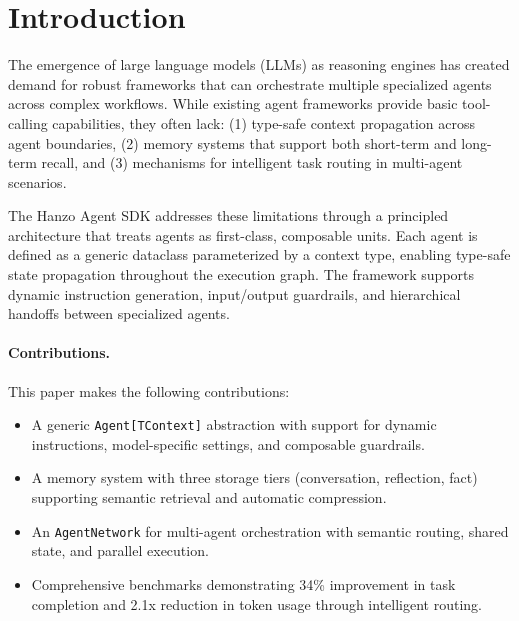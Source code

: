 \section{Introduction}


The emergence of large language models (LLMs) as reasoning engines has created demand for robust frameworks that can orchestrate multiple specialized agents across complex workflows. While existing agent frameworks provide basic tool-calling capabilities, they often lack: (1) type-safe context propagation across agent boundaries, (2) memory systems that support both short-term and long-term recall, and (3) mechanisms for intelligent task routing in multi-agent scenarios.

The Hanzo Agent SDK addresses these limitations through a principled architecture that treats agents as first-class, composable units. Each agent is defined as a generic dataclass parameterized by a context type, enabling type-safe state propagation throughout the execution graph. The framework supports dynamic instruction generation, input/output guardrails, and hierarchical handoffs between specialized agents.

\paragraph{Contributions.} This paper makes the following contributions:
\begin{itemize}
    \item A generic \texttt{Agent[TContext]} abstraction with support for dynamic instructions, model-specific settings, and composable guardrails.
    \item A memory system with three storage tiers (conversation, reflection, fact) supporting semantic retrieval and automatic compression.
    \item An \texttt{AgentNetwork} for multi-agent orchestration with semantic routing, shared state, and parallel execution.
    \item Comprehensive benchmarks demonstrating 34\% improvement in task completion and 2.1x reduction in token usage through intelligent routing.
\end{itemize}

